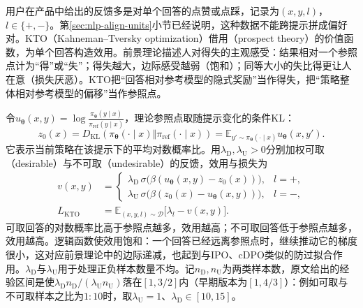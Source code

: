 用户在产品中给出的反馈多是对单个回答的点赞或点踩，记录为$(x,y,l)$，$l\in\{+,-\}$。第\ref{sec:nlp-align-units}小节已经说明，这种数据不能跨提示拼成偏好对。KTO（Kahneman--Tversky optimization）借用（prospect theory）的价值函数，为单个回答构造效用。前景理论描述人对得失的主观感受：结果相对一个参照点计为“得”或“失”；得失越大，边际感受越弱（饱和）；同等大小的失比得更让人在意（损失厌恶）。KTO把“回答相对参考模型的隐式奖励”当作得失，把“策略整体相对参考模型的偏移”当作参照点。

令$u_{\bm{\theta}}(x,y)=\log\frac{\pi_{\bm{\theta}}(y\mid x)}{\pi_{\mathrm{ref}}(y\mid x)}$，理论参照点取随提示变化的条件KL：
\begin{equation}
 z_0(x)=D_{\mathrm{KL}}(\pi_{\bm\theta}(\cdot\mid x)\Vert\pi_{\mathrm{ref}}(\cdot\mid x))
 =\mathbb E_{y'\sim\pi_{\bm\theta}(\cdot\mid x)}u_{\bm\theta}(x,y').
 \label{eq:nlp-align-kto-reference}
\end{equation}
它表示当前策略在该提示下的平均对数概率比。用$\lambda_{\mathrm D},\lambda_{\mathrm U}>0$分别加权可取（desirable）与不可取（undesirable）的反馈，效用与损失为
\begin{equation}
\label{eq:nlp-align-kto}
\begin{aligned}
 v(x,y)&=\begin{cases}
 \lambda_{\mathrm D}\,\sigma\bigl(\beta(u_{\bm{\theta}}(x,y)-z_0(x))\bigr),&l=+,\\
 \lambda_{\mathrm U}\,\sigma\bigl(\beta(z_0(x)-u_{\bm{\theta}}(x,y))\bigr),&l=-,
 \end{cases}\\
 L_{\mathrm{KTO}}&=\mathbb{E}_{(x,y,l)\sim\mathcal{D}}\bigl[\lambda_l-v(x,y)\bigr].
\end{aligned}
\end{equation}
可取回答的对数概率比高于参照点越多，效用越高；不可取回答低于参照点越多，效用越高。逻辑函数使效用饱和：一个回答已经远离参照点时，继续推动它的梯度很小，这对应前景理论中的边际递减，也起到与IPO、cDPO类似的防过拟合作用。$\lambda_{\mathrm D}$与$\lambda_{\mathrm U}$用于处理正负样本数量不均。记$n_{\mathrm D},n_{\mathrm U}$为两类样本数，原文给出的经验区间是使$\lambda_{\mathrm D}n_{\mathrm D}/(\lambda_{\mathrm U}n_{\mathrm U})$落在$[1,3/2]$内（早期版本为$[1,4/3]$）：例如可取与不可取样本之比为$1:10$时，取$\lambda_{\mathrm U}=1$、$\lambda_{\mathrm D}\in[10,15]$。

